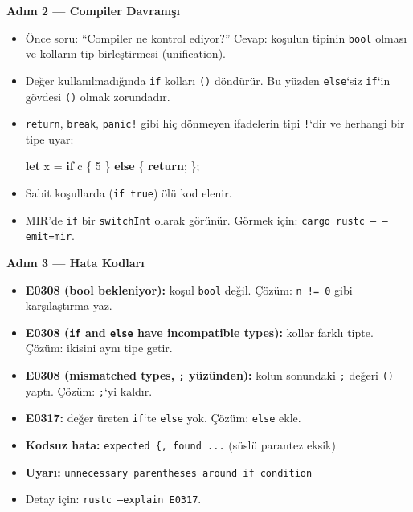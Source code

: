 \documentclass[12pt,a4paper]{article}
\newenvironment{Shaded}{}{}
\newcommand{\ControlFlowTok}[1]{\textcolor[rgb]{0.00,0.44,0.13}{\textbf{#1}}}
\newcommand{\DecValTok}[1]{\textcolor[rgb]{0.25,0.63,0.44}{#1}}
\newcommand{\KeywordTok}[1]{\textcolor[rgb]{0.00,0.44,0.13}{\textbf{#1}}}
\newcommand{\NormalTok}[1]{#1}
\newcommand{\OperatorTok}[1]{\textcolor[rgb]{0.40,0.40,0.40}{#1}}
\begin{document}
\textbf{Adım 2 --- Compiler Davranışı}

\begin{itemize}
\tightlist
\item
  Önce soru: ``Compiler ne kontrol ediyor?'' Cevap: koşulun tipinin \texttt{bool} olması ve kolların tip birleştirmesi (unification).
\item
  Değer kullanılmadığında \texttt{if} kolları \texttt{()} döndürür. Bu yüzden \texttt{else}`siz \texttt{if}`in gövdesi \texttt{()} olmak zorundadır.
\item
  \texttt{return}, \texttt{break}, \texttt{panic!} gibi hiç dönmeyen ifadelerin tipi \texttt{!}`dir ve herhangi bir tipe uyar:

\begin{Shaded}
\begin{Highlighting}[]
\KeywordTok{let}\NormalTok{ x }\OperatorTok{=} \ControlFlowTok{if}\NormalTok{ c }\OperatorTok{\{} \DecValTok{5} \OperatorTok{\}} \ControlFlowTok{else} \OperatorTok{\{} \ControlFlowTok{return}\OperatorTok{;} \OperatorTok{\};}
\end{Highlighting}
\end{Shaded}
\item
  Sabit koşullarda (\texttt{if\ true}) ölü kod elenir.
\item
  MIR'de \texttt{if} bir \texttt{switchInt} olarak görünür. Görmek için: \texttt{cargo\ rustc\ --\ --emit=mir}.
\end{itemize}

\textbf{Adım 3 --- Hata Kodları}

\begin{itemize}
\tightlist
\item
  \textbf{E0308 (bool bekleniyor):} koşul \texttt{bool} değil. Çözüm: \texttt{n\ !=\ 0} gibi karşılaştırma yaz.
\item
  \textbf{E0308 (\texttt{if} and \texttt{else} have incompatible types):} kollar farklı tipte. Çözüm: ikisini aynı tipe getir.
\item
  \textbf{E0308 (mismatched types, \texttt{;} yüzünden):} kolun sonundaki \texttt{;} değeri \texttt{()} yaptı. Çözüm: \texttt{;}`yi kaldır.
\item
  \textbf{E0317:} değer üreten \texttt{if}`te \texttt{else} yok. Çözüm: \texttt{else} ekle.
\item
  \textbf{Kodsuz hata:} \texttt{expected\ \{,\ found\ ...} (süslü parantez eksik)
\item
  \textbf{Uyarı:} \texttt{unnecessary\ parentheses\ around\ if\ condition}
\item
  Detay için: \texttt{rustc\ --explain\ E0317}.
\end{itemize}
\end{document}
